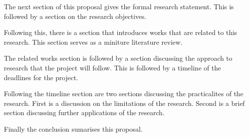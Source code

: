   The next section of this proposal gives the formal research statement.
  This is followed by a section on the research objectives.

  Following this, there is a section that introduces works that are related to this research.
  This section serves as a miniture literature review. 

  The related works section is followed by a section discussing the approach to research that the project will follow.
  This is followed by a timeline of the deadlines for the project.

  Following the timeline section are two sections discussing the practicalites of the research.
  First is a discussion on the limitations of the research.
  Second is a brief section discussing further applications of the research.

  Finally the conclusion sumarises this proposal.
